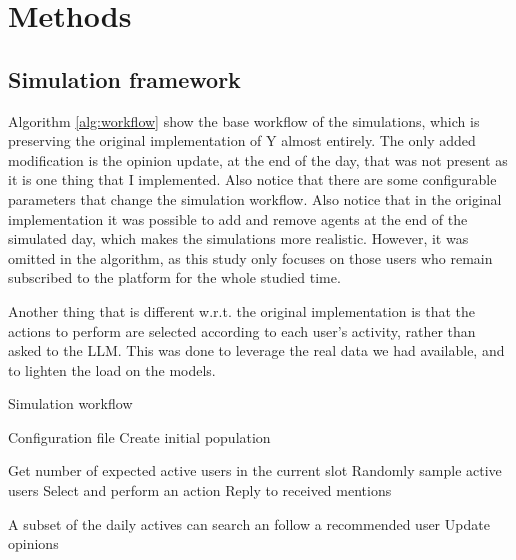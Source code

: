 \section{Methods}
\label{sec:methods}


\subsection{Simulation framework}
Algorithm \ref{alg:workflow} show the base workflow of the simulations, which is preserving the original implementation of Y almost entirely.
The only added modification is the opinion update, at the end of the day, that was not present as it is one thing that I implemented. 
Also notice that there are some configurable parameters that change the simulation workflow.
Also notice that in the original implementation it was possible to add and remove agents at the end of the simulated day, which makes the simulations more realistic. However, it was omitted in the algorithm, as this study only focuses on those users who remain subscribed to the platform for the whole studied time. 

Another thing that is different w.r.t. the original implementation is that the actions to perform are selected according to each user's activity, rather than asked to the LLM. This was done to leverage the real data we had available, and to lighten the load on the models.

\begin{algorithm}
\caption{Simulation workflow}
\label{alg:workflow}
\begin{algorithmic}[1]
\REQUIRE Configuration file
\STATE Create initial population

        \STATE Get number of expected active users in the current slot
        \STATE Randomly sample active users
            \STATE Select and perform an action
            \STATE Reply to received mentions
        \ENDFOR
    \ENDFOR

    \STATE A subset of the daily actives can search an follow a recommended user
    \STATE Update opinions
\ENDFOR
\end{algorithmic}
\end{algorithm}



